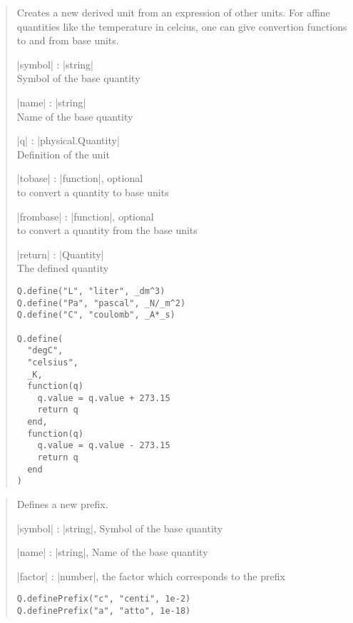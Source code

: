 \documentclass{ltxdoc}
\begin{document}
\begin{quote}
  Creates a new derived unit from an expression of other units. For affine quantities like the temperature in celcius, one can give convertion functions to and from base units.

  \subtitle{Parameters}
  \begin{description}
  \item |symbol| : |string|\\
  Symbol of the base quantity

  \item |name| : |string|\\
    Name of the base quantity

  \item |q| : |physical.Quantity|\\
    Definition of the unit

  \item |tobase| : |function|, optional\\
    to convert a quantity to base units

  \item |frombase| : |function|, optional\\
    to convert a quantity from the base units

  \item |return| : |Quantity|\\
    The defined quantity
  \end{description}

  \subtitle{Examples}
  \begin{lstlisting}
Q.define("L", "liter", _dm^3)
Q.define("Pa", "pascal", _N/_m^2)
Q.define("C", "coulomb", _A*_s)

Q.define(
  "degC", 
  "celsius",
  _K, 
  function(q)
    q.value = q.value + 273.15
    return q
  end,
  function(q)
    q.value = q.value - 273.15
    return q
  end
)
  \end{lstlisting}
\end{quote}






\begin{quote}
  Defines a new prefix.

  \begin{description}
  \item |symbol| : |string|, Symbol of the base quantity

  \item |name| : |string|, Name of the base quantity

  \item |factor| : |number|, the factor which corresponds to the prefix
  \end{description}


\begin{lstlisting}
Q.definePrefix("c", "centi", 1e-2)
Q.definePrefix("a", "atto", 1e-18)
\end{lstlisting}
\end{quote}
\end{document}
